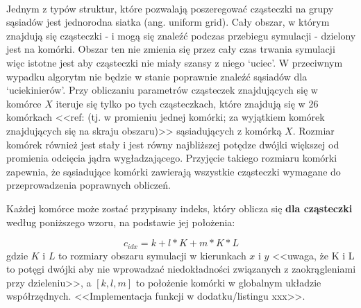 \paragraph{}
Jednym z typów struktur, które pozwalają poszeregować cząsteczki na grupy sąsiadów jest jednorodna siatka (ang. uniform grid). Cały obszar, w którym znajdują się cząsteczki - i mogą się znaleźć podczas przebiegu symulacji - dzielony jest na komórki. Obszar ten nie zmienia się przez cały czas trwania symulacji więc istotne jest aby cząsteczki nie miały szansy z niego `uciec'. W przeciwnym wypadku algorytm nie będzie w stanie poprawnie znaleźć sąsiadów dla `uciekinierów'. Przy obliczaniu parametrów cząsteczek znajdujących się w komórce $X$ iteruje się tylko po tych cząsteczkach, które znajdują się w 26 komórkach <<ref: (tj. w promieniu jednej komórki; za wyjątkiem komórek znajdujących się na skraju obszaru)>> sąsiadujących z komórką $X$. Rozmiar komórek również jest stały i jest równy najbliższej potędze dwójki większej od promienia odcięcia jądra wygładzającego. Przyjęcie takiego rozmiaru komórki zapewnia, że sąsiadujące komórki zawierają wszystkie cząsteczki wymagane do przeprowadzenia poprawnych obliczeń.
\par
Każdej komórce może zostać przypisany indeks, który oblicza się \textbf{dla cząsteczki} według poniższego wzoru, na podstawie jej położenia:

\begin{equation}
c_{idx} = k + l * K + m * K * L
\label{eqn:get_cell_index}
\end{equation}
gdzie $K$ i $L$ to rozmiary obszaru symulacji w kierunkach $x$ i $y$ <<uwaga, że K i L to potęgi dwójki aby nie wprowadzać niedokładności związanych z zaokrągleniami przy dzieleniu>>, a $[k, l, m]$ to położenie komórki w globalnym układzie współrzędnych. <<Implementacja funkcji w dodatku/listingu xxx>>.

